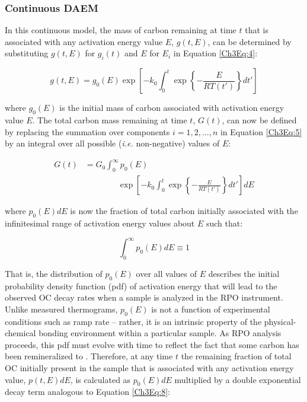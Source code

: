 \subsubsection{Continuous DAEM}

In this continuous model, the mass of carbon remaining at time $t$ that is associated with any activation energy value $E$, $g(t, E)$, can be determined by substituting $g(t,E)$ for $g_{i}(t)$ and $E$ for $E_{i}$ in Equation \ref{Ch3Eq:4}:

\begin{equation}\label{Ch3Eq:8}
	g(t, E) = g_{0}(E) \exp \left[ - k_{0} \int_{0}^{t} \exp \left\{ - \frac{E}{RT(t')} \right\} dt' \right]
\end{equation}

where $g_{0}(E)$ is the initial mass of carbon associated with activation energy value $E$. The total carbon mass remaining at time $t$, $G(t)$, can now be defined by replacing the summation over components $i = 1,2,\dots,n$ in Equation \ref{Ch3Eq:5} by an integral over all possible (\textit{i.e.} non-negative) values of $E$:

\begin{equation}\label{Ch3Eq:9}
	\begin{split}
	G(t) & = G_{0} \int_{0}^{\infty} p_{0}(E) \\
	& \qquad\qquad \exp \left[ - k_{0} \int_{0}^{t} \exp \left\{ - \frac{E}{RT(t')} \right\} dt' \right] dE
	\end{split}
\end{equation}

where $p_{0}(E) dE$ is now the fraction of total carbon initially associated with the infinitesimal range of activation energy values about $E$ such that:

\begin{equation}\label{Ch3Eq:10}
    \int_{0}^{\infty} p_{0}(E) dE  \equiv 1
\end{equation}

That is, the distribution of $p_{0}(E)$ over all values of $E$ describes the initial probability density function (pdf) of activation energy that will lead to the observed OC decay rates when a sample is analyzed in the RPO instrument. Unlike measured thermograms, $p_{0}(E)$ is not a function of experimental conditions such as ramp rate -- rather, it is an intrinsic property of the physical-chemical bonding environment within a particular sample. As RPO analysis proceeds, this pdf must evolve with time to reflect the fact that some carbon has been remineralized to . Therefore, at any time $t$ the remaining fraction of total OC initially present in the sample that is associated with any activation energy value, $p(t, E) dE$, is calculated as $p_{0}(E)dE$ multiplied by a double exponential decay term analogous to Equation \ref{Ch3Eq:8}:

